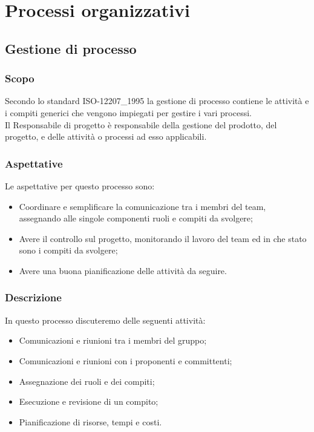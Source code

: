 \section{Processi organizzativi}

\subsection{Gestione di processo} \label{_gestioneDiProcesso}

\subsubsection{Scopo}
Secondo lo standard ISO-12207\_1995 la gestione di processo contiene le attività e i compiti generici che vengono impiegati per gestire i vari processi.\\
Il Responsabile di progetto è responsabile della gestione del prodotto, del progetto, e delle attività o processi ad esso applicabili.
\subsubsection{Aspettative}
Le aspettative per questo processo sono:
\begin{itemize}
    \item Coordinare e semplificare la comunicazione tra i membri del team, assegnando alle singole componenti ruoli e compiti da svolgere;
    \item Avere il controllo sul progetto, monitorando il lavoro del team ed in che stato sono i compiti da svolgere;
    \item Avere una buona pianificazione delle attività da seguire.
\end{itemize}

\subsubsection{Descrizione}
In questo processo discuteremo delle seguenti attività:
\begin{itemize}
    \item Comunicazioni e riunioni tra i membri del gruppo;
    \item Comunicazioni e riunioni con i proponenti e committenti;
    \item Assegnazione dei ruoli e dei compiti;
    \item Esecuzione e revisione di un compito;
    \item Pianificazione di risorse, tempi e costi.
\end{itemize}

